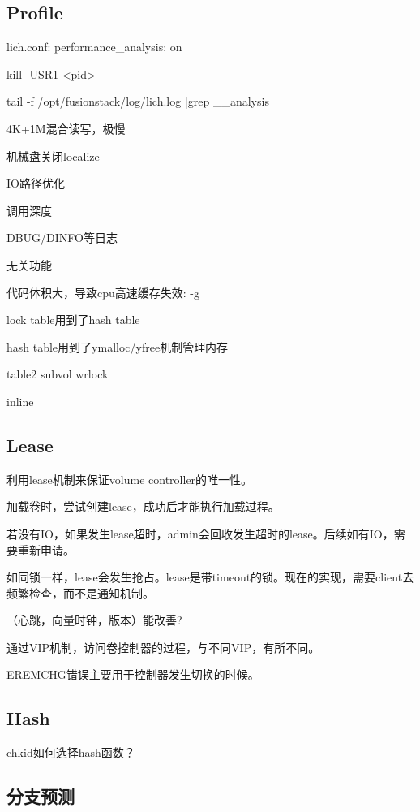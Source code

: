 \subsection{Profile}

lich.conf: performance\_analysis: on

kill -USR1 <pid>

tail -f /opt/fusionstack/log/lich.log |grep \_\_analysis

4K+1M混合读写，极慢

机械盘关闭localize

IO路径优化
\begin{enumbox}
\item 调用深度
\item DBUG/DINFO等日志
\item 无关功能
\item 代码体积大，导致cpu高速缓存失效: -g
\item lock table用到了hash table
\item hash table用到了ymalloc/yfree机制管理内存
\item table2 subvol wrlock
\item inline
\end{enumbox}

\subsection{Lease}

利用lease机制来保证volume controller的唯一性。

加载卷时，尝试创建lease，成功后才能执行加载过程。

若没有IO，如果发生lease超时，admin会回收发生超时的lease。后续如有IO，需要重新申请。

如同锁一样，lease会发生抢占。lease是带timeout的锁。现在的实现，需要client去频繁检查，而不是通知机制。

（心跳，向量时钟，版本）能改善?

通过VIP机制，访问卷控制器的过程，与不同VIP，有所不同。

EREMCHG错误主要用于控制器发生切换的时候。

\subsection{Hash}

chkid如何选择hash函数？

\subsection{分支预测}

